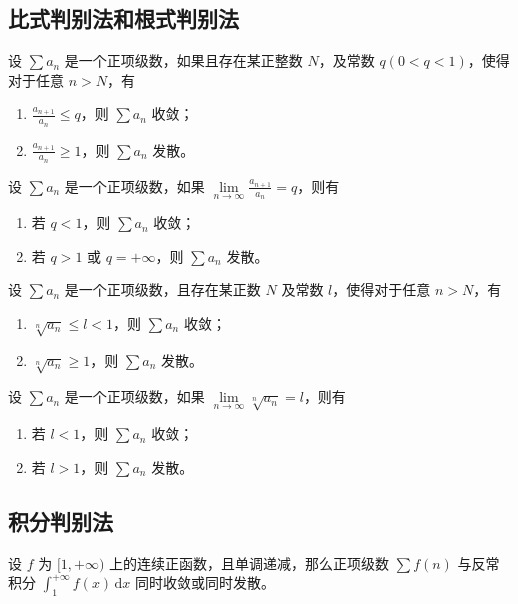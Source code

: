 \subsection{比式判别法和根式判别法}

\begin{theorem}[比式判别法]
    设 $\sum a_{n}$ 是一个正项级数，如果且存在某正整数 $N$，及常数 $q(0<q<1)$，使得对于任意 $n > N$，有
    \begin{enumerate}
        \item $\frac{a_{n+1}}{a_{n}} \leq q$，则 $\sum a_{n}$ 收敛；
        \item $\frac{a_{n+1}}{a_{n}} \geq 1$，则 $\sum a_{n}$ 发散。
    \end{enumerate}
\end{theorem}

\begin{theorem}[比式判别法的极限形式]
    设 $\sum a_{n}$ 是一个正项级数，如果 $\lim\limits_{n \to \infty} \frac{a_{n+1}}{a_{n}} = q$，则有
    \begin{enumerate}
        \item 若 $q < 1$，则 $\sum a_{n}$ 收敛；
        \item 若 $q > 1$ 或 $q = +\infty$，则 $\sum a_{n}$ 发散。
    \end{enumerate}
\end{theorem}

\begin{theorem}[根式判别法]
    设 $\sum a_{n}$ 是一个正项级数，且存在某正数 $N$ 及常数 $l$，使得对于任意 $n > N$，有
    \begin{enumerate}
        \item $\sqrt[n]{a_{n}} \leq l < 1$，则 $\sum a_{n}$ 收敛；
        \item $\sqrt[n]{a_{n}} \geq 1$，则 $\sum a_{n}$ 发散。
    \end{enumerate}
\end{theorem}

\begin{theorem}[根式判别法的极限形式]
    设 $\sum a_{n}$ 是一个正项级数，如果 $\lim\limits_{n \to \infty} \sqrt[n]{a_{n}} = l$，则有
    \begin{enumerate}
        \item 若 $l < 1$，则 $\sum a_{n}$ 收敛；
        \item 若 $l > 1$，则 $\sum a_{n}$ 发散。
    \end{enumerate}
\end{theorem}

\subsection{积分判别法}

\begin{theorem}[积分判别法]
设 $f$ 为 $[1,+\infty)$ 上的连续正函数，且单调递减，那么正项级数 $\sum f(n)$ 与反常积分 $\int_{1}^{+\infty} f(x) \, \mathrm{d}x$ 同时收敛或同时发散。
\end{theorem}